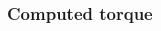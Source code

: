 %
\begin{frame}
\frametitle{Computed torque}
%
\begin{columns}
	\begin{column}{0.5\textwidth}
	\begin{figure}
	\end{figure}
	\end{column}
	\begin{column}{0.5\textwidth}
	\begin{figure}
	\end{figure}
	\end{column}
\end{columns}
\end{frame}
%
